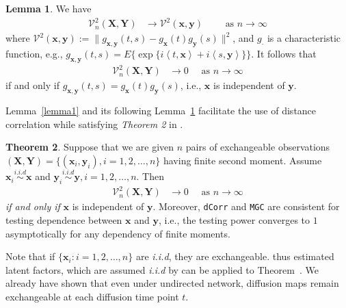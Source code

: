 \documentclass[12pt]{article}
\theoremstyle{definition}
\newtheorem{theorem}{Theorem}[section]
\newtheorem{lemma}[theorem]{Lemma}
\begin{document}
\begin{lemma}
	\label{lemma2}
We have 
	\begin{eqnarray}
		\mathcal{V}_{n}^{2}(\mathbf{X},\mathbf{Y}) &\longrightarrow \mathcal{V}^{2}(\mathbf{x},\mathbf{y}) \quad \quad \mbox{ as } n \rightarrow \infty
	\label{eq:conv1}
	\end{eqnarray}
where $\mathcal{V}^{2} (\mathbf{x},\mathbf{y}) := \| g_{\mathbf{x},\mathbf{y}}(t,s) - g_{\mathbf{x}}(t) g_{\mathbf{y}}(s) \|^2$, and $g_{\cdot}$ is a characteristic function, e.g., $g_{\mathbf{x},\mathbf{y}}(t,s) = E\{\exp\{i \left\langle t,\mathbf{x} \right\rangle  +i \left\langle  s,\mathbf{y}\right\rangle \}\}$.
	It follows that 
	\begin{eqnarray}
		\mathcal{V}_{n}^{2}(\mathbf{X},\mathbf{Y}) &\rightarrow 0 \quad \mbox{ as } n \rightarrow \infty
		\label{eq:conv2}
	\end{eqnarray}
	if and only if $g_{\mathbf{x},\mathbf{y}}(t,s) = g_{\mathbf{x}}(t) g_{\mathbf{y}}(s)$, i.e., $\mathbf{x}$ is independent of $\mathbf{y}$.
\end{lemma}
Lemma~\ref{lemma1} and its following Lemma~\ref{lemma2} facilitate the use of distance correlation while satisfying \textit{Theorem 2} in \cite{szekely2007measuring}.  

\begin{theorem}
	\label{theoremMain}
	Suppose that we are given $n$ pairs of exchangeable observations $(\mathbf{X}, \mathbf{Y}) = \{  (\mathbf{x}_{i}, \mathbf{y}_{i} ), i = 1,2, \ldots, n \}$ having finite second moment. Assume $\mathbf{x}_{i} \overset{i.i.d}{\sim} \mathbf{x}$ and $\mathbf{y}_{i} \overset{i.i.d}{\sim} \mathbf{y}, i = 1,2, \ldots, n$. Then
	\begin{eqnarray*}
		\mathcal{V}_{n}^{2}(\mathbf{X},\mathbf{Y}) &\longrightarrow 0 \quad \mbox{ as } n \rightarrow \infty
	\end{eqnarray*}	
	\textit{if and only if} $\mathbf{x}$ is independent of $\mathbf{y}$. Moreover, \texttt{dCorr} and \texttt{MGC} are consistent for testing dependence between $\mathbf{x}$ and $\mathbf{y}$, i.e., the testing power converges to $1$ asymptotically for any dependency of finite moments.
\end{theorem}

Note that if $\{ \mathbf{x}_{i} : i = 1,2,\ldots, n \}$ are \textit{i.i.d}, they are exchangeable. thus estimated latent factors, which are assumed \textit{i.i.d} by \cite{fosdick2015testing} can be applied to Theorem~\label{theoremMain}. We already have shown that even under undirected network, diffusion maps remain exchangeable at each diffusion time point $t$. 
\end{document}
